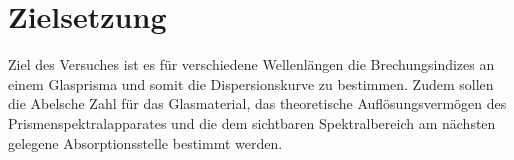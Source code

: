 
\section{Zielsetzung}
\label{sec:Zielsetzung}

Ziel des Versuches ist es für verschiedene Wellenlängen die Brechungsindizes an einem Glasprisma und somit die Dispersionskurve zu bestimmen. Zudem sollen die Abelsche Zahl für das Glasmaterial, das theoretische Auflösungsvermögen des Prismenspektralapparates und die dem sichtbaren Spektralbereich am nächsten gelegene Absorptionsstelle bestimmt werden.